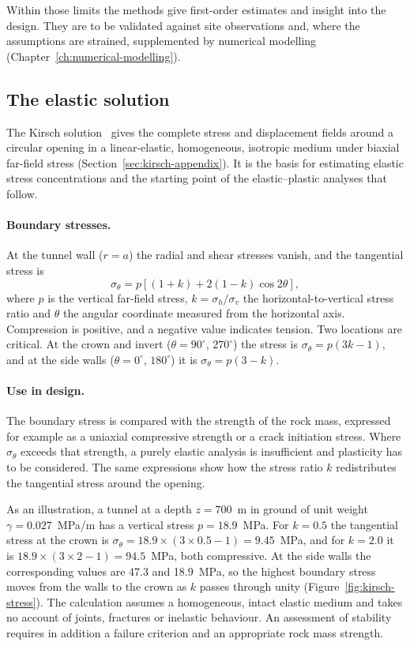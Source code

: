 Within those limits the methods give first-order estimates and insight
into the design. They are to be validated against site observations and,
where the assumptions are strained, supplemented by numerical modelling
(Chapter~\ref{ch:numerical-modelling}).

\subsection{The elastic solution}
\label{sec:kirsch-solution}

The Kirsch solution~\citep{kirsch1898} gives the complete stress and
displacement fields around a circular opening in a linear-elastic,
homogeneous, isotropic medium under biaxial far-field stress
(Section~\ref{sec:kirsch-appendix}). It is the basis for estimating elastic
stress concentrations and the starting point of the elastic--plastic
analyses that follow.

\paragraph{Boundary stresses.}
At the tunnel wall ($r = a$) the radial and shear stresses vanish, and the
tangential stress is
\[
\sigma_\theta = p\left[(1 + k) + 2(1 - k)\cos 2\theta\right],
\]
where $p$ is the vertical far-field stress, $k = \sigma_h / \sigma_v$ the
horizontal-to-vertical stress ratio and $\theta$ the angular coordinate
measured from the horizontal axis. Compression is positive, and a negative
value indicates tension. Two locations are critical. At the crown and invert
($\theta = 90^\circ$, $270^\circ$) the stress is $\sigma_\theta = p(3k - 1)$,
and at the side walls ($\theta = 0^\circ$, $180^\circ$) it is
$\sigma_\theta = p(3 - k)$.

\paragraph{Use in design.}
The boundary stress is compared with the strength of the rock mass, expressed
for example as a uniaxial compressive strength or a crack initiation stress.
Where $\sigma_\theta$ exceeds that strength, a purely elastic analysis is
insufficient and plasticity has to be considered. The same expressions show
how the stress ratio $k$ redistributes the tangential stress around the
opening.

As an illustration, a tunnel at a depth $z = 700$~m in ground of unit weight
$\gamma = 0.027$~MPa/m has a vertical stress $p = 18.9$~MPa. For $k = 0.5$
the tangential stress at the crown is
$\sigma_\theta = 18.9 \times (3 \times 0.5 - 1) = 9.45$~MPa, and for
$k = 2.0$ it is $18.9 \times (3 \times 2 - 1) = 94.5$~MPa, both compressive.
At the side walls the corresponding values are 47.3 and 18.9~MPa, so the
highest boundary stress moves from the walls to the crown as $k$ passes
through unity (Figure~\ref{fig:kirsch-stress}). The calculation assumes a homogeneous, intact elastic medium
and takes no account of joints, fractures or inelastic behaviour. An
assessment of stability requires in addition a failure criterion and an
appropriate rock mass strength.

